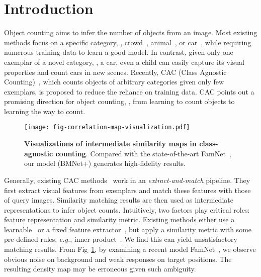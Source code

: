 \documentclass[10pt,twocolumn,letterpaper]{article}
\begin{document}
\section{Introduction}
\label{sec:intro}
Object counting aims to infer the number of objects from an image. Most existing methods focus on a specific category, \eg, crowd~\cite{zhang_2015_CVPR}, animal~\cite{count_animals}, or car~\cite{car_counting}, while requiring numerous training data to learn a good model. In contrast, given only one exemplar of a novel category, \eg, a car, even a child can easily capture its visual properties and count cars in new scenes. Recently, CAC (Class Agnostic Counting)~\cite{gmn, cfocnet, famnet}, which counts objects of arbitrary categories given only few exemplars, is proposed to reduce 
the 
reliance on training data. CAC points out a promising direction for object counting, \ie, from learning to count objects to learning the way to count.
\begin{figure}[t]
  \centering
   \texttt{[image: fig-correlation-map-visualization.pdf]}\vspace{-5pt}
   \caption{\textbf{Visualizations of intermediate similarity maps in class-agnostic counting}. Compared with the state-of-the-art FamNet~\cite{famnet}, our model (BMNet+) generates high-fidelity results.}
   \label{fig:corr-map}
   \vspace{-5pt}
\end{figure}

Generally, existing CAC methods~\cite{gmn, cfocnet, famnet} work in an \textit{extract-and-match} pipeline. They first extract visual features from exemplars and match these features with those of query images. Similarity matching results are then used as intermediate representations to infer object counts. Intuitively, two factors play critical roles: feature representation and similarity metric. Existing methods either use a learnable~\cite{gmn, cfocnet} or a fixed feature extractor~\cite{famnet}, but apply a similarity metric with some pre-defined rules, \textit{e.g.}, inner product~\cite{cfocnet, famnet}. We find this can yield unsatisfactory matching results. From Fig~\ref{fig:corr-map}, by examining a recent model FamNet~\cite{famnet}, we observe obvious noise on 
background and weak responses on target positions. The resulting density map may be erroneous given such ambiguity. 
\end{document}
